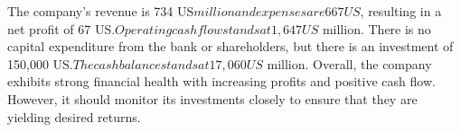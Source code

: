 

The company's revenue is 734 US$ million and expenses are 667 US$, resulting in a net profit of 67 US$. Operating cash flow stands at 1,647 US$ million. There is no capital expenditure from the bank or shareholders, but there is an investment of 150,000 US$. The cash balance stands at 17,060 US$ million. Overall, the company exhibits strong financial health with increasing profits and positive cash flow. However, it should monitor its investments closely to ensure that they are yielding desired returns.